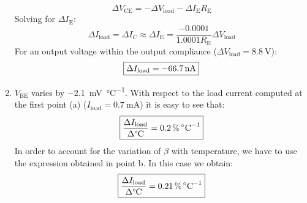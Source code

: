 \begin{enumerate}
    \[\Delta V_\text{CE}=-\Delta V_\text{load}-\Delta I_\text{E}R_\text{E}\]
    Solving for $\Delta I_\text{E}$:
    \[\Delta I_\text{load}=\Delta I_{C}\approx \Delta I_\text{E}=\frac{-0.0001}{1.0001R_\text{E}}\Delta V_\text{load}\]
    For an output voltage within the output compliance ($\Delta V_\text{load}=\SI{8.8}{\volt}$):
    \[\boxed{\Delta I_\text{load}=\SI{-66.7}{\nano\ampere}}\]
    \item 
    $V_\text{BE}$ varies by \SI{-2.1}{\milli\volt\per\celsius}. With respect to the load current computed at the first point (a) ($I_\text{load}=\SI{0.7}{\milli\ampere}$) it is easy to see that:
    \[\boxed{\frac{\Delta I_\text{load}}{\Delta \text{°C}}=\SI{0.2}{\percent\per\celsius}}\]
    In order to account for the variation of $\beta$ with temperature, we have to use the expression obtained in point b. In this case we obtain:
    \[\boxed{\frac{\Delta I_\text{load}}{\Delta \text{°C}}=\SI{0.21}{\percent\per\celsius}}\]
\end{enumerate}

